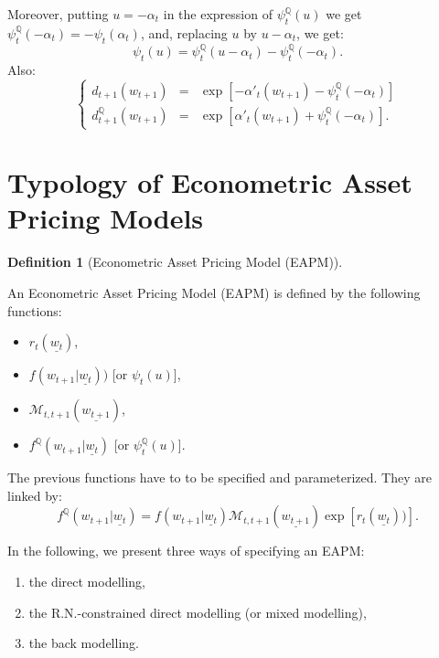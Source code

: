 \documentclass[
  12pt,
]{book}
\providecommand{\tightlist}{%
  \setlength{\itemsep}{0pt}\setlength{\parskip}{0pt}}
\theoremstyle{definition}
\newtheorem{definition}{Definition}[chapter]
\theoremstyle{definition}
\theoremstyle{definition}
\theoremstyle{definition}
\theoremstyle{remark}
\begin{document}
Moreover, putting \(u=-\alpha_t\) in the expression of
\(\psi^{\mathbb{Q}}_t(u)\) we get \(\psi^{\mathbb{Q}}_t(-\alpha_t)=-\psi_t(\alpha_t)\),
and, replacing \(u\) by \(u-\alpha_t\), we get:
\[
\boxed{\psi_t(u) = \psi^{\mathbb{Q}}_t(u-\alpha_t)-\psi^{\mathbb{Q}}_t(-\alpha_t).}
\]
Also:
\begin{equation*}
\left\{
\begin{array}{ccl}
d_{t+1}(w_{t+1}) &=& \exp[-\alpha'_t(w_{t+1})-\psi^{\mathbb{Q}}_t(-\alpha_t)] \\
d^{\mathbb{Q}}_{t+1}(w_{t+1}) &=& \exp[\alpha'_t(w_{t+1})+\psi^{\mathbb{Q}}_t(-\alpha_t)].
\end{array}
\right.
\end{equation*}

\hypertarget{PricingTypology}{%
\section{Typology of Econometric Asset Pricing Models}\label{PricingTypology}}

\begin{definition}[Econometric Asset Pricing Model (EAPM)]
\protect\hypertarget{def:typo}{}\label{def:typo}

An Econometric Asset Pricing Model (EAPM) is defined by the following functions:

\begin{itemize}
\tightlist
\item
  \(r_{t}(\underline{w_t})\),
\item
  \(f(w_{t+1}|\underline{w_t}))\) {[}or \(\psi_t(u)\){]},
\item
  \(\mathcal{M}_{t,t+1}(\underline{w_{t+1}})\),
\item
  \(f^{\mathbb{Q}}(w_{t+1}|\underline{w_t})\) {[}or \(\psi^{\mathbb{Q}}_t(u)\){]}.
\end{itemize}

\end{definition}

The previous functions have to to be specified and parameterized. They are linked by:
\[
f^{\mathbb{Q}}(w_{t+1}|\underline{w_t}) = f(w_{t+1}|\underline{w_t}) \mathcal{M}_{t,t+1}(\underline{w_{t+1}}) \exp[r_{t}(\underline{w_t}))].
\]

In the following, we present three ways of specifying an EAPM:

\begin{enumerate}
\def\labelenumi{\arabic{enumi}.}
\tightlist
\item
  the direct modelling,
\item
  the R.N.-constrained direct modelling (or mixed modelling),
\item
  the back modelling.
\end{enumerate}
\end{document}
